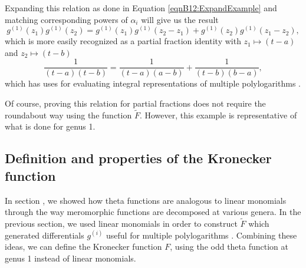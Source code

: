 Expanding this relation as done in Equation \ref{eqnB12:ExpandExample} and matching corresponding powers of $\alpha_i$ will give us the result
\begin{equation}
    g^{(1)}(z_1)g^{(1)}(z_2) = g^{(1)}(z_1)g^{(1)}(z_2-z_1) + g^{(1)}(z_2)g^{(1)}(z_1-z_2),
\end{equation}
which is more easily recognized as a partial fraction identity with $z_1 \mapsto (t-a)$ and $z_2 \mapsto (t-b)$
\begin{equation}
    \frac{1}{(t-a)(t-b)} = \frac{1}{(t-a)(a-b)} + \frac{1}{(t-b)(b-a)},
\end{equation}
which has uses for evaluating integral representations of multiple polylogarithms \cite{Broedel_2015}.

Of course, proving this relation for partial fractions does not require the roundabout way using the function $\tilde F$. However, this example is representative of what is done for genus 1.

\subsection{Definition and properties of the Kronecker function}

In section \label{secB12:decomposition}, we showed how theta functions are analogous to linear monomials through the way meromorphic functions are decomposed at various genera. In the previous section, we used linear monomials in order to construct $\tilde F$ which generated differentials $g^{(i)}$ useful for multiple polylogarithms \cite{rep:B1}. Combining these ideas, we can define the Kronecker function $F$, using the odd theta function at genus 1 instead of linear monomials.

